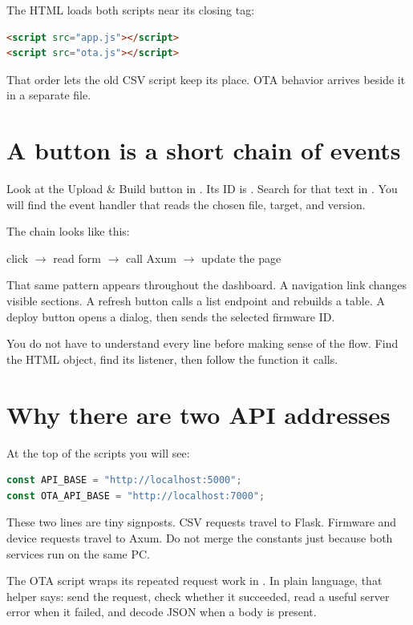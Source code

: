 The HTML loads both scripts near its closing tag:

\begin{lstlisting}[language=HTML,numbers=none]
<script src="app.js"></script>
<script src="ota.js"></script>
\end{lstlisting}

That order lets the old CSV script keep its place. OTA behavior arrives beside it in a separate file.

\section{A button is a short chain of events}

Look at the Upload \& Build button in . Its ID is . Search for that text in . You will find the event handler that reads the chosen file, target, and version.

The chain looks like this:

\begin{center}
\ttfamily click $\rightarrow$ read form $\rightarrow$ call Axum $\rightarrow$ update the page
\end{center}

That same pattern appears throughout the dashboard. A navigation link changes visible sections. A refresh button calls a list endpoint and rebuilds a table. A deploy button opens a dialog, then sends the selected firmware ID.

You do not have to understand every line before making sense of the flow. Find the HTML object, find its listener, then follow the function it calls.

\section{Why there are two API addresses}

At the top of the scripts you will see:

\begin{lstlisting}[language=JavaScript]
const API_BASE = "http://localhost:5000";
const OTA_API_BASE = "http://localhost:7000";
\end{lstlisting}

These two lines are tiny signposts. CSV requests travel to Flask. Firmware and device requests travel to Axum. Do not merge the constants just because both services run on the same PC.

The OTA script wraps its repeated request work in . In plain language, that helper says: send the request, check whether it succeeded, read a useful server error when it failed, and decode JSON when a body is present.

